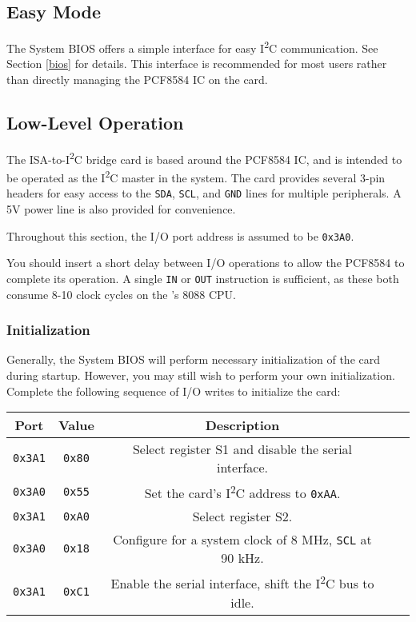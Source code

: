 \documentclass[twoside,10pt,letterpaper]{refart}
\newcommand{\itwoc}{I\textsuperscript{2}C}
\begin{document}
\subsection{Easy Mode}
The  System BIOS offers a simple interface for easy \itwoc{} communication. See Section \ref{bios} for details.
This interface is recommended for most users rather than directly managing the PCF8584 IC on the card.

\subsection{Low-Level Operation}
The ISA-to-\itwoc{} bridge card is based around the PCF8584 IC, and is intended to be operated as the \itwoc
master in the system. The card provides several 3-pin headers for easy access to the \texttt{SDA}, \texttt{SCL},
and \texttt{GND} lines for multiple peripherals. A 5V power line is also provided for convenience.

Throughout this section, the I/O port address is assumed to be \texttt{0x3A0}.

You should insert a short delay between I/O operations to allow the PCF8584 to complete its operation. A single
\texttt{IN} or \texttt{OUT} instruction is sufficient, as these both consume 8-10 clock cycles on the 's 8088
CPU.

\subsubsection{Initialization}
Generally, the  System BIOS will perform necessary initialization of the card during startup.
However, you may still wish to perform your own initialization. Complete the following sequence of I/O writes
to initialize the card:

\begin{center}
    \begin{tabular}{ c|c|c|c|c }
        \textbf{Port} & \textbf{Value} & \textbf{Description} \\
        \hline
        \texttt{0x3A1} & \texttt{0x80} & Select register S1 and disable the serial interface. \\
        \texttt{0x3A0} & \texttt{0x55} & Set the card's \itwoc{} address to \texttt{0xAA}. \\
        \texttt{0x3A1} & \texttt{0xA0} & Select register S2. \\
        \texttt{0x3A0} & \texttt{0x18} & Configure for a system clock of 8 MHz\footnotemark, \texttt{SCL} at 90 kHz. \\
        \texttt{0x3A1} & \texttt{0xC1} & Enable the serial interface, shift the \itwoc{} bus to idle. \\
    \end{tabular}
\end{center}
\end{document}
